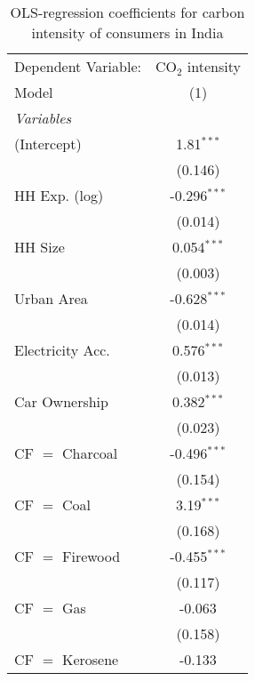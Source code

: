 
\begin{table}[htbp!]
   \centering
   \small
   \begin{adjustbox}{width = 1\textwidth, max height = 0.95\textheight, center}
      \begin{threeparttable}[b]
         \caption{\label{tab:OLS_1_IND} OLS-regression coefficients for carbon intensity of consumers in India}
         \begin{tabular}{lc}
            \tabularnewline \midrule \midrule
            Dependent Variable: & CO$_{2}$ intensity\\  
            Model               & (1)\\  
            \midrule
            \emph{Variables}\\
            (Intercept)         & 1.81$^{***}$\\   
                                & (0.146)\\   
            HH Exp. (log)       & -0.296$^{***}$\\   
                                & (0.014)\\   
            HH Size             & 0.054$^{***}$\\   
                                & (0.003)\\   
            Urban Area          & -0.628$^{***}$\\   
                                & (0.014)\\   
            Electricity Acc.    & 0.576$^{***}$\\   
                                & (0.013)\\   
            Car Ownership       & 0.382$^{***}$\\   
                                & (0.023)\\   
            CF $=$ Charcoal     & -0.496$^{***}$\\   
                                & (0.154)\\   
            CF $=$ Coal         & 3.19$^{***}$\\   
                                & (0.168)\\   
            CF $=$ Firewood     & -0.455$^{***}$\\   
                                & (0.117)\\   
            CF $=$ Gas          & -0.063\\   
                                & (0.158)\\   
            CF $=$ Kerosene     & -0.133\\   

\end{tabular}
\end{threeparttable}
\end{adjustbox}
\end{table}
